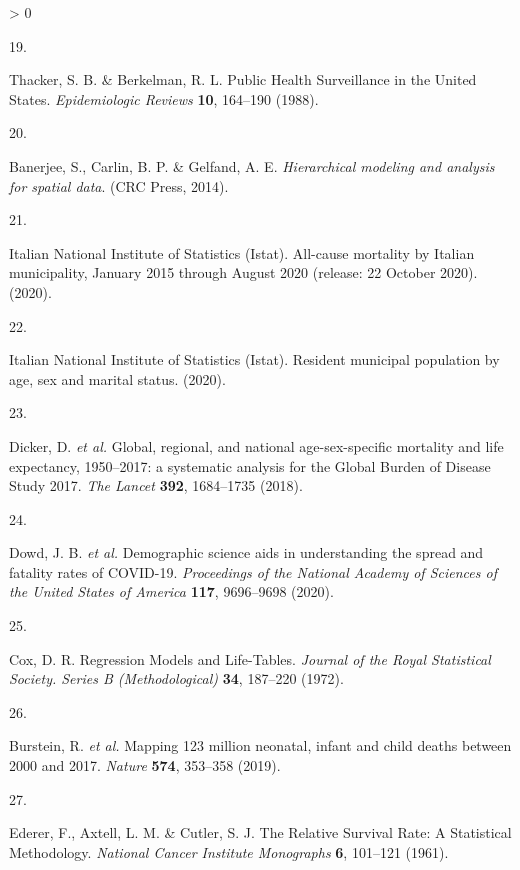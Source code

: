 \documentclass[
]{article}
\newlength{\cslhangindent}
\newlength{\csllabelwidth}
\newenvironment{CSLReferences}[2] %
 {%
  \setlength{\parindent}{0pt}
  \ifodd #1 \everypar{\setlength{\hangindent}{\cslhangindent}}\ignorespaces\fi
  \ifnum #2 > 0
  \setlength{\parskip}{#2\baselineskip}
  \fi
 }%
 {}
\newcommand{\CSLLeftMargin}[1]{\parbox[t]{\csllabelwidth}{#1}}
\newcommand{\CSLRightInline}[1]{\parbox[t]{\linewidth - \csllabelwidth}{#1}\break}
\begin{document}
\begin{CSLReferences}{0}{0}
\leavevmode\hypertarget{ref-Thacker1988}{}%
\CSLLeftMargin{19. }
\CSLRightInline{Thacker, S. B. \& Berkelman, R. L. {Public Health Surveillance in the United States}. \emph{Epidemiologic Reviews} \textbf{10}, 164--190 (1988).}

\leavevmode\hypertarget{ref-Banerjee2014}{}%
\CSLLeftMargin{20. }
\CSLRightInline{Banerjee, S., Carlin, B. P. \& Gelfand, A. E. \emph{{Hierarchical modeling and analysis for spatial data}}. (CRC Press, 2014).}

\leavevmode\hypertarget{ref-ItalianNationalInstituteofStatisticsIstat2020a}{}%
\CSLLeftMargin{21. }
\CSLRightInline{Italian National Institute of Statistics (Istat). {All-cause mortality by Italian municipality, January 2015 through August 2020 (release: 22 October 2020).} (2020).}

\leavevmode\hypertarget{ref-ItalianNationalInstituteofStatisticsIstat2020}{}%
\CSLLeftMargin{22. }
\CSLRightInline{Italian National Institute of Statistics (Istat). {Resident municipal population by age, sex and marital status}. (2020).}

\leavevmode\hypertarget{ref-Dicker2018}{}%
\CSLLeftMargin{23. }
\CSLRightInline{Dicker, D. \emph{et al.} {Global, regional, and national age-sex-specific mortality and life expectancy, 1950--2017: a systematic analysis for the Global Burden of Disease Study 2017}. \emph{The Lancet} \textbf{392}, 1684--1735 (2018).}

\leavevmode\hypertarget{ref-Dowd2020}{}%
\CSLLeftMargin{24. }
\CSLRightInline{Dowd, J. B. \emph{et al.} {Demographic science aids in understanding the spread and fatality rates of COVID-19}. \emph{Proceedings of the National Academy of Sciences of the United States of America} \textbf{117}, 9696--9698 (2020).}

\leavevmode\hypertarget{ref-Cox1972}{}%
\CSLLeftMargin{25. }
\CSLRightInline{Cox, D. R. {Regression Models and Life-Tables}. \emph{Journal of the Royal Statistical Society. Series B (Methodological)} \textbf{34}, 187--220 (1972).}

\leavevmode\hypertarget{ref-Burstein2019}{}%
\CSLLeftMargin{26. }
\CSLRightInline{Burstein, R. \emph{et al.} {Mapping 123 million neonatal, infant and child deaths between 2000 and 2017}. \emph{Nature} \textbf{574}, 353--358 (2019).}

\leavevmode\hypertarget{ref-Ederer1961}{}%
\CSLLeftMargin{27. }
\CSLRightInline{Ederer, F., Axtell, L. M. \& Cutler, S. J. {The Relative Survival Rate: A Statistical Methodology}. \emph{National Cancer Institute Monographs} \textbf{6}, 101--121 (1961).}


\end{CSLReferences}
\end{document}
